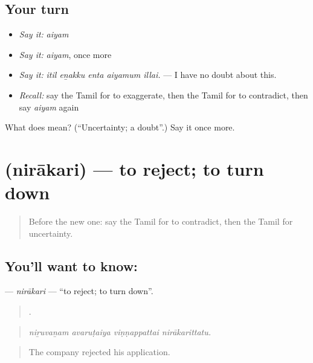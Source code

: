 \subsection*{Your turn}
\begin{itemize}
\raggedright
  \item \emph{Say it:} \emph{aiyam}
  \item \emph{Say it:} \emph{aiyam}, once more
  \item \emph{Say it:} \emph{itil eṉakku enta aiyamum illai.} — I have no doubt about this.
  \item \emph{Recall:} say the Tamil for to exaggerate, then the Tamil for to contradict, then say \emph{aiyam} again
\end{itemize}

\begin{tcolorbox}[breakable,colback=teal!4,colframe=teal!35!black,title={Before you move on}]
What does  mean? (\textquotedblleft{}Uncertainty; a doubt\textquotedblright{}.) Say it once more.
\end{tcolorbox}
\section[\texorpdfstring{\ta{நிராகரி} (nirākari)}{நிராகரி (nirākari)}]{ (nirākari) — to reject; to turn down}

\label{lesson:TA-C359-nirakari}



\begin{quote}
Before the new one: say the Tamil for to contradict, then the Tamil for uncertainty.
\end{quote}

\subsection*{You'll want to know: }
\textbf{} — \emph{nirākari} — \textquotedblleft{}to reject; to turn down\textquotedblright{}.

\begin{quote}
   .
\end{quote}

\begin{quote}
\emph{niṟuvaṉam avaruṭaiya viṇṇappattai nirākarittatu.}
\end{quote}

\begin{quote}
The company rejected his application.
\end{quote}

